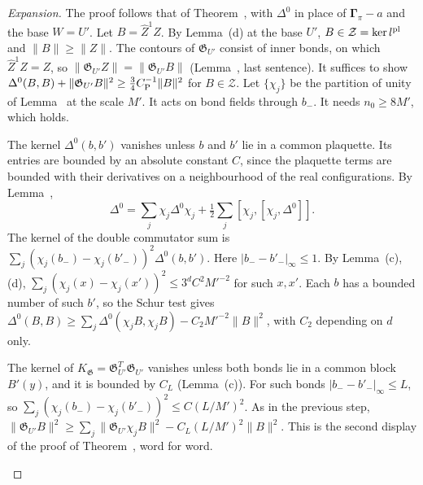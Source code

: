 \begin{proof}[Expansion]
The proof follows that of Theorem~, with $\Delta^0$ in place of $\boldsymbol\Gamma_\pi-a$ and the base $W=U'$. Let $B=\hat Z^1Z$. By Lemma~(d) at the base $U'$, $B\in\mathcal Z=\ker l^{\rm pl}$ and $\|B\|\ge\|Z\|$. The contours of $\mathfrak G_{U'}$ consist of inner bonds, on which $\hat Z^1Z=Z$, so $\|\mathfrak G_{U'}Z\|=\|\mathfrak G_{U'}B\|$ (Lemma~, last sentence). It suffices to show $\Delta^0(B,B)+\|\mathfrak G_{U'}B\|^2\ge\frac34C_{\rm P}^{-1}\|B\|^2$ for $B\in\mathcal Z$. Let $\{\chi_j\}$ be the partition of unity of Lemma~ at the scale $M'$. It acts on bond fields through $b_-$. It needs $n_0\ge8M'$, which holds.

\begin{step}
The kernel $\Delta^0(b,b')$ vanishes unless $b$ and $b'$ lie in a common plaquette. Its entries are bounded by an absolute constant $C$, since the plaquette terms are bounded with their derivatives on a neighbourhood of the real configurations. By Lemma~,
\[
\Delta^0=\sum_j\chi_j\Delta^0\chi_j+\tfrac12\sum_j[\chi_j,[\chi_j,\Delta^0]] .
\]
The kernel of the double commutator sum is $\sum_j(\chi_j(b_-)-\chi_j(b'_-))^2\Delta^0(b,b')$. Here $|b_--b'_-|_\infty\le1$. By Lemma~(c),(d), $\sum_j(\chi_j(x)-\chi_j(x'))^2\le3^dC^2M'^{-2}$ for such $x,x'$. Each $b$ has a bounded number of such $b'$, so the Schur test gives $\Delta^0(B,B)\ge\sum_j\Delta^0(\chi_jB,\chi_jB)-C_2M'^{-2}\|B\|^2$, with $C_2$ depending on $d$ only.
\end{step}

\begin{step}
The kernel of $K_{\mathfrak G}=\mathfrak G_{U'}^T\mathfrak G_{U'}$ vanishes unless both bonds lie in a common block $B'(y)$, and it is bounded by $C_L$ (Lemma~(c)). For such bonds $|b_--b'_-|_\infty\le L$, so $\sum_j(\chi_j(b_-)-\chi_j(b'_-))^2\le C(L/M')^2$. As in the previous step, $\|\mathfrak G_{U'}B\|^2\ge\sum_j\|\mathfrak G_{U'}\chi_jB\|^2-C_L(L/M')^2\|B\|^2$. This is the second display of the proof of Theorem~, word for word.
\end{step}


\end{proof}
